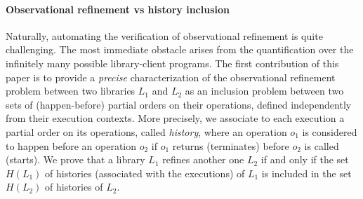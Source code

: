 \paragraph{Observational refinement vs history inclusion} Naturally, automating the verification of observational refinement is quite challenging. The most immediate obstacle arises from the quantification over the infinitely many possible library-client programs. The first contribution of this paper is to provide a {\em precise} characterization of the observational refinement problem between two libraries $L_1$ and $L_2$ as an inclusion problem between two sets of (happen-before) partial orders on their operations, defined independently from their execution contexts. 
More precisely, we associate to each execution a partial order on its operations, called {\em history}, where an operation $o_1$ is considered to happen before an operation $o_2$ if $o_1$ returns (terminates) before $o_2$ is called (starts). We prove that a library $L_1$ refines another one $L_2$ if and only if the set $H(L_1)$ of histories (associated with the executions) of $L_1$ is included in the set $H(L_2)$ of histories of $L_2$.

